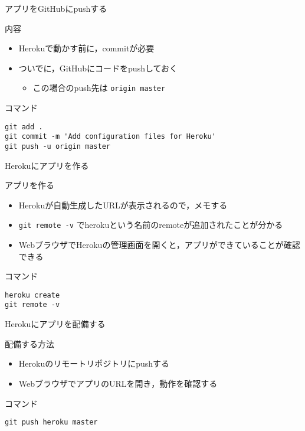 \documentclass[t, aspectratio=169]{beamer}
\begin{document}
\begin{frame}[fragile,label=sec-5-2-5]{アプリをGitHubにpushする}
 \begin{block}{内容}
\begin{itemize}
\item Herokuで動かす前に，commitが必要
\item ついでに，GitHubにコードをpushしておく
\begin{itemize}
\item この場合のpush先は \texttt{origin master}
\end{itemize}
\end{itemize}
\end{block}

\begin{block}{コマンド}
\begin{verbatim}
git add .
git commit -m 'Add configuration files for Heroku'
git push -u origin master
\end{verbatim}
\end{block}
\end{frame}
\begin{frame}[fragile,label=sec-5-2-6]{Herokuにアプリを作る}
 \begin{block}{アプリを作る}
\begin{itemize}
\item Herokuが自動生成したURLが表示されるので，メモする
\item \texttt{git remote -v} でherokuという名前のremoteが追加されたことが分かる
\item WebブラウザでHerokuの管理画面を開くと，アプリができていることが確認できる
\end{itemize}
\end{block}
\begin{block}{コマンド}
\begin{verbatim}
heroku create
git remote -v
\end{verbatim}
\end{block}
\end{frame}
\begin{frame}[fragile,label=sec-5-2-7]{Herokuにアプリを配備する}
 \begin{block}{配備する方法}
\begin{itemize}
\item Herokuのリモートリポジトリにpushする
\item WebブラウザでアプリのURLを開き，動作を確認する
\end{itemize}
\end{block}

\begin{block}{コマンド}
\begin{verbatim}
git push heroku master
\end{verbatim}
\end{block}
\end{frame}
\end{document}
